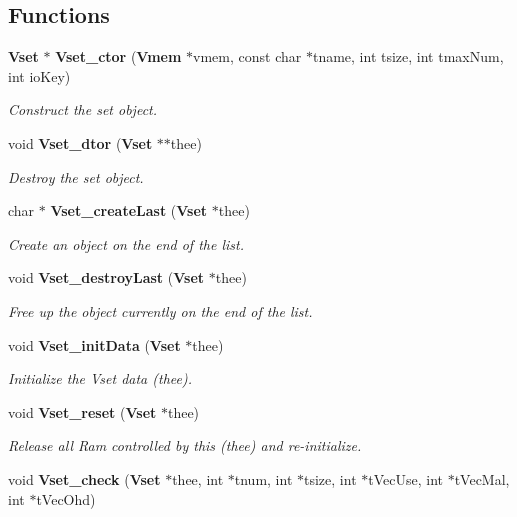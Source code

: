 \subsection*{Functions}
\begin{DoxyCompactItemize}
\item 
{\bf Vset} $\ast$ {\bf Vset\_\-ctor} ({\bf Vmem} $\ast$vmem, const char $\ast$tname, int tsize, int tmaxNum, int ioKey)
\begin{DoxyCompactList}\small\item\em Construct the set object. \item\end{DoxyCompactList}\item 
void {\bf Vset\_\-dtor} ({\bf Vset} $\ast$$\ast$thee)
\begin{DoxyCompactList}\small\item\em Destroy the set object. \item\end{DoxyCompactList}\item 
char $\ast$ {\bf Vset\_\-createLast} ({\bf Vset} $\ast$thee)
\begin{DoxyCompactList}\small\item\em Create an object on the end of the list. \item\end{DoxyCompactList}\item 
void {\bf Vset\_\-destroyLast} ({\bf Vset} $\ast$thee)
\begin{DoxyCompactList}\small\item\em Free up the object currently on the end of the list. \item\end{DoxyCompactList}\item 
void {\bf Vset\_\-initData} ({\bf Vset} $\ast$thee)
\begin{DoxyCompactList}\small\item\em Initialize the Vset data (thee). \item\end{DoxyCompactList}\item 
void {\bf Vset\_\-reset} ({\bf Vset} $\ast$thee)
\begin{DoxyCompactList}\small\item\em Release all Ram controlled by this (thee) and re-\/initialize. \item\end{DoxyCompactList}\item 
void {\bf Vset\_\-check} ({\bf Vset} $\ast$thee, int $\ast$tnum, int $\ast$tsize, int $\ast$tVecUse, int $\ast$tVecMal, int $\ast$tVecOhd)
$$
\end{DoxyCompactItemize}
